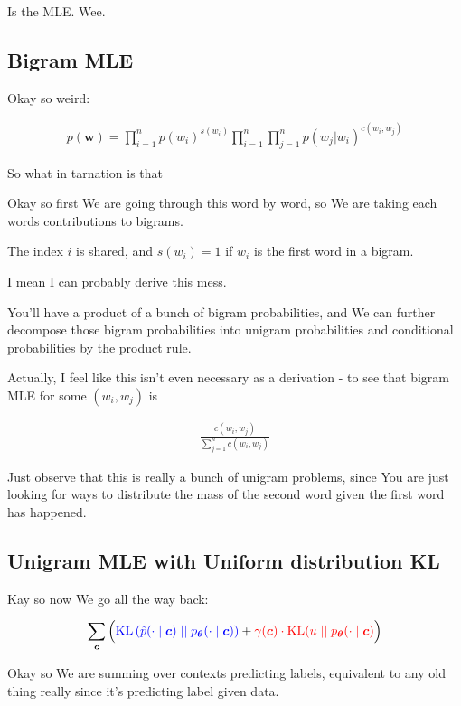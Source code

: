 \documentclass{article}
\newcommand{\KL}{\mathrm{KL}}
\newcommand{\uniform}{u}
\newcommand{\vtheta}{\boldsymbol{\theta}}
\newcommand{\model}{p_{\vtheta}}
\newcommand{\context}{\boldsymbol{c}}
\begin{document}
		Is the MLE. Wee.
		
	\subsection{Bigram MLE}
	
		Okay so weird:
		
		\begin{align}
			p(\mathbf{w}) = \prod^n_{i=1} p(w_i)^{s(w_i)}\prod^n_{i=1}\prod^n_{j=1} p(w_j|w_i)^{c(w_i, w_j)}
		\end{align}
		
		So what in tarnation is that
		
		Okay so first We are going through this word by word, so We are taking each words contributions to bigrams. 
		
		The index $i$ is shared, and $s(w_i) = 1$ if $w_i$ is the first word in a bigram.
		
		I mean I can probably derive this mess. 
		
		You'll have a product of a bunch of bigram probabilities, and We can further decompose those bigram probabilities into unigram probabilities and conditional probabilities by the product rule.
		
		Actually, I feel like this isn't even necessary as a derivation - to see that bigram MLE for some $(w_i, w_j)$ is
		
		\begin{align}
			\frac{c(w_i, w_j)}{\sum_{j=1}^n c(w_i, w_j)}
		\end{align}
		
		Just observe that this is really a bunch of unigram problems, since You are just looking for ways to distribute the mass of the second word given the first word has happened.
		
	\subsection{Unigram MLE with Uniform distribution KL}
	
		Kay so now We go all the way back:
		
		\begin{align}
	  	 \sum_{\context} \Big( {\color{blue} \KL\left(\tilde{p}(\cdot 			\mid \context) \mid\mid \model(\cdot \mid \context)					\right)} + {\color{red}\gamma(\context) \cdot 						\KL(\uniform \mid\mid \model(\cdot \mid \context)}\Big)
		\end{align}
		
		Okay so We are summing over contexts predicting labels, equivalent to any old thing really since it's predicting label given data.
		
\end{document}
